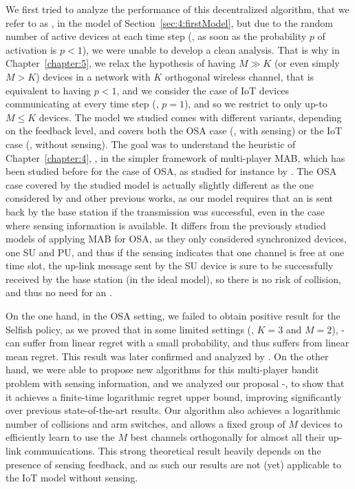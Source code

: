 We first tried to analyze the performance of this decentralized algorithm, that we refer to as \Selfish, in the model of Section~\ref{sec:4:firstModel},
but due to the random number of active devices at each time step (\ie, as soon as the probability $p$ of activation is $p < 1$), we were unable to develop a clean analysis.
%
That is why in Chapter~\ref{chapter:5}, we relax the hypothesis of having $M \gg K$ (or even simply $M > K$) devices in a network with $K$ orthogonal wireless channel, that is equivalent to having $p < 1$, and we consider the case of IoT devices communicating at every time step (\ie, $p=1$), and so we restrict to only up-to $M \leq K$ devices.
The model we studied comes with different variants, depending on the feedback level, and covers both the OSA case (\ie, with sensing) or the IoT case (\ie, without sensing).
The goal was to understand the heuristic of Chapter~\ref{chapter:4}, \Selfish, in the simpler framework of multi-player MAB, which has been studied before for the case of OSA, as studied for instance by \cite{Zhao10,Anandkumar10,Anandkumar11}.
%
The OSA case covered by the studied model is actually slightly different as the one considered by \cite{Jouini10} and other previous works,
as our model requires that an \Ack{} is sent back by the base station if the transmission was successful, even in the case where sensing information is available.
It differs from the previously studied models of applying MAB for OSA, as they only considered synchronized devices, one SU and PU, and thus if the sensing indicates that one channel is free at one time slot, the up-link message sent by the SU device is sure to be successfully received by the base station (in the ideal model), so there is no risk of collision, and thus no need for an \Ack.


On the one hand, in the OSA setting, we failed to obtain positive result for the Selfish policy, as we proved that in some limited settings (\eg, $K=3$ and $M=2$), \Selfish-\UCB{} can suffer from linear regret with a small probability, and thus suffers from linear mean regret.
This result was later confirmed and analyzed by \cite{BoursierPerchet18}.
%
On the other hand, we were able to propose new algorithms for this multi-player bandit problem with sensing information, and we analyzed our proposal \MCTopM-\klUCB, to show that it achieves a finite-time logarithmic regret upper bound, improving significantly over previous state-of-the-art results.
Our algorithm also achieves a logarithmic number of collisions and arm switches, and allows a fixed group of $M$ devices to efficiently learn to use the $M$ best channels orthogonally for almost all their up-link communications.
%
This strong theoretical result heavily depends on the presence of sensing feedback, and as such our results are not (yet) applicable to the IoT model without sensing.

